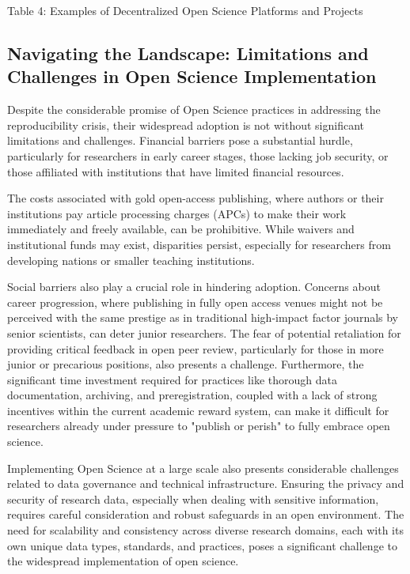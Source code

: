 \documentclass{article}
\begin{document}
Table 4: Examples of Decentralized Open Science Platforms and Projects

\subsection{Navigating the Landscape: Limitations and Challenges in Open Science Implementation}

Despite the considerable promise of Open Science practices in addressing the reproducibility crisis, their widespread adoption is not without significant limitations and challenges. Financial barriers pose a substantial hurdle, particularly for researchers in early career stages, those lacking job security, or those affiliated with institutions that have limited financial resources.

The costs associated with gold open-access publishing, where authors or their institutions pay article processing charges (APCs) to make their work immediately and freely available, can be prohibitive. While waivers and institutional funds may exist, disparities persist, especially for researchers from developing nations or smaller teaching institutions.

Social barriers also play a crucial role in hindering adoption. Concerns about career progression, where publishing in fully open access venues might not be perceived with the same prestige as in traditional high-impact factor journals by senior scientists, can deter junior researchers. The fear of potential retaliation for providing critical feedback in open peer review, particularly for those in more junior or precarious positions, also presents a challenge. Furthermore, the significant time investment required for practices like thorough data documentation, archiving, and preregistration, coupled with a lack of strong incentives within the current academic reward system, can make it difficult for researchers already under pressure to "publish or perish" to fully embrace open science.

Implementing Open Science at a large scale also presents considerable challenges related to data governance and technical infrastructure. Ensuring the privacy and security of research data, especially when dealing with sensitive information, requires careful consideration and robust safeguards in an open environment. The need for scalability and consistency across diverse research domains, each with its own unique data types, standards, and practices, poses a significant challenge to the widespread implementation of open science.
\end{document}
